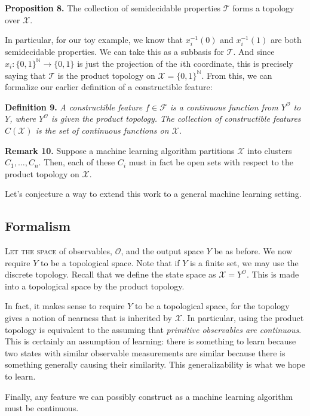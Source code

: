 \documentclass[10]{article}
\providecommand{\bbN}{\mathbb{N}}
\theoremstyle{plain}
\begin{document}
\textbf{Proposition 8.}
The collection of semidecidable properties $\mathcal{T}$ forms a topology over $\mathcal{X}$.

In particular, for our toy example, we know that $x_i^{-1}(0)$ and $x_i^{-1}(1)$ are both semidecidable properties. We can take this as a subbasis for $\mathcal{T}$. And since $x_i: \{0,1\}^\bbN \to \{0,1\}$ is just the projection of the $i$th coordinate, this is precisely saying that $\mathcal{T}$ is the product topology on $\mathcal{X} = \{0,1\}^\bbN$. From this, we can formalize our earlier definition of a constructible feature:

\textbf{Definition 9.}
\emph{A \emph{constructible feature} $f \in \mathcal{F}$ is a continuous function from $Y^\mathcal{O}$ to $Y$, where $Y^\mathcal{O}$ is given the product topology. The collection of constructible features $C(\mathcal{X})$ is the set of continuous functions on $\mathcal{X}$.}

\textbf{Remark 10.}
Suppose a machine learning algorithm partitions $\mathcal{X}$ into clusters $C_1,\dotsc, C_n$. Then, each of these $C_i$ must in fact be open sets with respect to the product topology on $\mathcal{X}$.


Let's conjecture a way to extend this work to a general machine learning setting.

\subsection{Formalism}
\textsc{Let the space} of observables, $\mathcal{O}$, and the output space $Y$ be as before. We now require $Y$ to be a topological space. Note that if $Y$ is a finite set, we may use the discrete topology. Recall that we define the state space as $\mathcal{X} = Y^\mathcal{O}$. This is made into a topological space by the product topology.

In fact, it makes sense to require $Y$ to be a topological space, for the topology gives a notion of nearness that is inherited by $\mathcal{X}$. In particular, using the product topology is equivalent to the assuming that \emph{primitive observables are continuous}. This is certainly an assumption of learning: there is something to learn because two states with similar observable measurements are similar because there is something generally causing their similarity. This generalizability is what we hope to learn.

Finally, any feature we can possibly construct as a machine learning algorithm must be continuous. 
\end{document}
